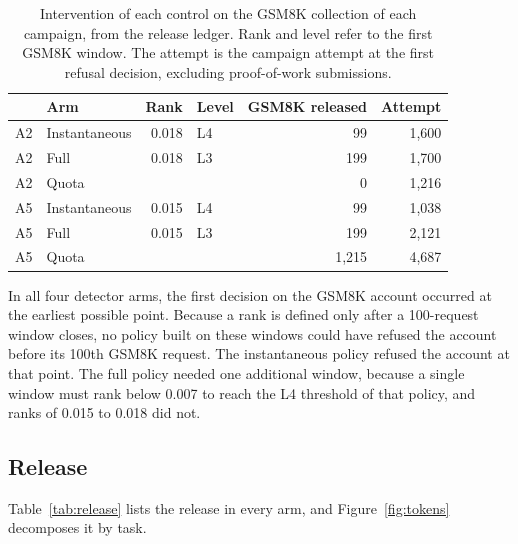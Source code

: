 \documentclass[conference]{IEEEtran}
\begin{document}
\begin{table}[!t]
\centering\footnotesize
\caption{Intervention of each control on the GSM8K collection of each campaign, from the release ledger. Rank and level refer to the first GSM8K window. The attempt is the campaign attempt at the first refusal decision, excluding proof-of-work submissions.}
\label{tab:timing}
\setlength{\tabcolsep}{3pt}
\begin{tabular*}{\columnwidth}{@{\extracolsep{\fill}}llrlrr@{}}\toprule
 & Arm & Rank & Level & GSM8K released & Attempt \\\midrule
A2 & Instantaneous & 0.018 & L4 & 99 & 1,600 \\
A2 & Full & 0.018 & L3 & 199 & 1,700 \\
A2 & Quota & & & 0 & 1,216 \\
A5 & Instantaneous & 0.015 & L4 & 99 & 1,038 \\
A5 & Full & 0.015 & L3 & 199 & 2,121 \\
A5 & Quota & & & 1,215 & 4,687 \\\bottomrule
\end{tabular*}
\end{table}

In all four detector arms, the first decision on the GSM8K account occurred at the earliest possible point. Because a rank is defined only after a 100-request window closes, no policy built on these windows could have refused the account before its 100th GSM8K request. The instantaneous policy refused the account at that point. The full policy needed one additional window, because a single window must rank below 0.007 to reach the L4 threshold of that policy, and ranks of 0.015 to 0.018 did not.

\subsection{Release}
Table~\ref{tab:release} lists the release in every arm, and Figure~\ref{fig:tokens} decomposes it by task.
\end{document}
